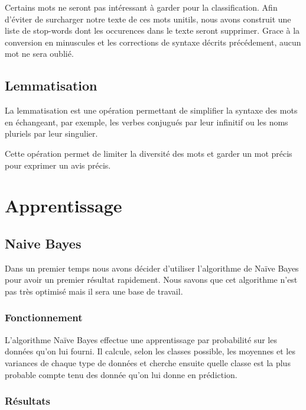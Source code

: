 \documentclass[a4paper]{report}
\begin{document}
            Certains mots ne seront pas intéressant à garder pour la classification. Afin d'éviter de surcharger notre texte de ces mots unitils, nous avons construit une liste de stop-words dont les occurences dans le texte seront supprimer. Grace à la conversion en minuscules et les corrections de syntaxe décrits précédement, aucun mot ne sera oublié.

        \section{Lemmatisation}

            La lemmatisation est une opération permettant de simplifier la syntaxe des mots en échangeant, par exemple, les verbes conjugués par leur infinitif ou les noms pluriels par leur singulier.

            Cette opération permet de limiter la diversité des mots et garder un mot précis pour exprimer un avis précis.

    \chapter{Apprentissage}



        \section{Naive Bayes}

            Dans un premier temps nous avons décider d'utiliser l'algorithme de Naïve Bayes pour avoir un premier résultat rapidement. Nous savons que cet algorithme n'est pas très optimisé mais il sera une base de travail.

            \subsection{Fonctionnement}

                L'algorithme Naïve Bayes effectue une apprentissage par probabilité sur les données qu'on lui fourni. Il calcule, selon les classes possible, les moyennes et les variances de chaque type de données et cherche ensuite quelle classe est la plus probable compte tenu des donnée qu'on lui donne en prédiction.

            \subsection{Résultats}
\end{document}
